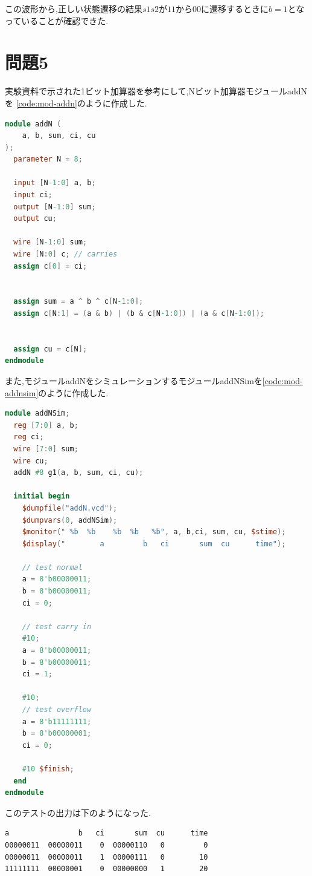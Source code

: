 \documentclass[autodetect-engine, dvi=dvipdfmx, 10pt, a4paper, ja=standard]{bxjsarticle}
\begin{document}
この波形から,正しい状態遷移の結果$s1s2$が$11$から$00$に遷移するときに$b=1$となっていることが確認できた.

\section{問題5}
\label{sec:ex-5}

実験資料で示された1ビット加算器を参考にして,Nビット加算器モジュールaddNを
\ref{code:mod-addn}のように作成した.

\begin{lstlisting}[language={Verilog}, caption={モジュールaddNのVerilogコード}, label={code:mod-addn}]
module addN (
    a, b, sum, ci, cu
);
  parameter N = 8;

  input [N-1:0] a, b;
  input ci;
  output [N-1:0] sum;
  output cu;

  wire [N-1:0] sum;
  wire [N:0] c; // carries
  assign c[0] = ci;


  assign sum = a ^ b ^ c[N-1:0];
  assign c[N:1] = (a & b) | (b & c[N-1:0]) | (a & c[N-1:0]);


  assign cu = c[N];
endmodule
\end{lstlisting}

また,モジュールaddNをシミュレーションするモジュールaddNSimを\ref{code:mod-addnsim}のように作成した.

\begin{lstlisting}[language={Verilog}, caption={モジュールaddNSimのVerilogコード}, label={code:mod-addnsim}]
module addNSim;
  reg [7:0] a, b;
  reg ci;
  wire [7:0] sum;
  wire cu;
  addN #8 g1(a, b, sum, ci, cu);

  initial begin
    $dumpfile("addN.vcd");
    $dumpvars(0, addNSim);
    $monitor(" %b  %b    %b  %b   %b", a, b,ci, sum, cu, $stime);
    $display("        a         b   ci       sum  cu      time");

    // test normal
    a = 8'b00000011;
    b = 8'b00000011;
    ci = 0;

    // test carry in
    #10;
    a = 8'b00000011;
    b = 8'b00000011;
    ci = 1;

    #10;
    // test overflow
    a = 8'b11111111;
    b = 8'b00000001;
    ci = 0;

    #10 $finish;
  end
endmodule
\end{lstlisting}

このテストの出力は下のようになった.

\begin{verbatim}
a                b   ci       sum  cu      time
00000011  00000011    0  00000110   0         0
00000011  00000011    1  00000111   0        10
11111111  00000001    0  00000000   1        20
\end{verbatim}
\end{document}
